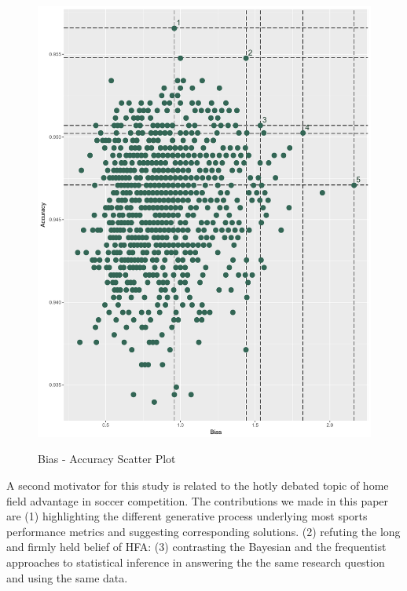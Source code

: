 \documentclass[USenglish]{article}
\begin{document}







\citep{Gajewski2006}


\begin{figure}
\caption{Bias - Accuracy Scatter Plot}
{\includegraphics[width=0.65\linewidth]{Rplot04.pdf}}
\label{fig1}
\end{figure}


A second motivator for this study is related to the hotly debated topic of home field advantage in soccer competition.
The contributions we made in this paper are (1) highlighting the different generative process underlying most sports performance metrics and suggesting corresponding solutions.  (2) refuting the long and firmly held belief of HFA: (3) contrasting the Bayesian and the frequentist approaches to statistical inference in answering the the same research question and using the same data.
 
\end{document}
